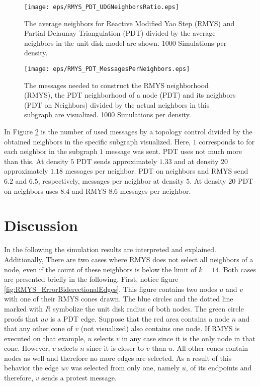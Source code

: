 \begin{figure}[h!]
\centering
\texttt{[image: eps/RMYS\_PDT\_UDGNeighborsRatio.eps]}
\caption{The average neighbors for Reactive Modified Yao Step (RMYS) and Partial Delaunay Triangulation (PDT) divided by the average neighbors in the unit disk model are shown. 1000 Simulations per density.}
\label{fig:RMYS_PDT_UDGNeighborsRatio}
\end{figure}

\begin{figure}[h!]
\centering
\texttt{[image: eps/RMYS\_PDT\_MessagesPerNeighbors.eps]}
\caption{The messages needed to construct the RMYS neighborhood (RMYS), the PDT neighborhood of a node (PDT) and its neighbors (PDT on Neighbors) divided by the actual neighbors in this subgraph are visualized. 1000 Simulations per density.}
\label{fig:RMYS_PDT_MessagesPerNeighbors}
\end{figure}

In Figure \ref{fig:RMYS_PDT_MessagesPerNeighbors} is the number of used messages by a topology control divided by the obtained neighbors in the specific subgraph visualized.
Here, $1 $ corresponds to for each neighbor in the subgraph $1 $ message was sent.
PDT uses not much more than this.
At density $5 $ PDT sends approximately $1.33$ and at density $20 $ approximately $1.18 $ messages per neighbor.
PDT on neighbors and RMYS send $6.2 $ and $6.5 $, respectively, messages per neighbor at density $5 $.
At density $20 $ PDT on neighbors uses $8.4 $ and RMYS $8.6 $ messages per neighbor.

\section{Discussion}
In the following the simulation results are interpreted and explained.
Additionally, 
There are two cases where RMYS does not select all neighbors of a node, even if the count of these neighbors is below the limit of $k=14 $.
Both cases are presented briefly in the following.
First, notice figure \ref{fig:RMYS_ErrorBiderectionalEdges}.
This figure contains two nodes $u $ and $v $ with one of their RMYS cones drawn.
The blue circles and the dotted line marked with $R $ symbolize the unit disk radius of both nodes.
The green circle proofs that $uv $ is a PDT edge.
Suppose that the red area contains a node $n $ and that any other cone of $v $ (not visualized) also contains one node.
If RMYS is executed on that example, $u $ selects $v $ in any case since it is the only node in that cone.
However, $v $ selects $n $ since it is closer to $v $ than $u $.
All other cones contain nodes as well and therefore no more edges are selected.
As a result of this behavior the edge $uv $ was selected from only one, namely $u $, of its endpoints and therefore, $v $ sends a protest message.

